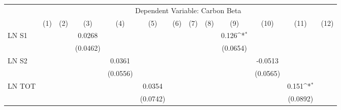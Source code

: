 {
\def\sym#1{\ifmmode^{#1}\else\(^{#1}\)\fi}
\begin{tabular}{l*{12}{c}}
\hline\hline
                    &\multicolumn{12}{c}{Dependent Variable: Carbon Beta}                                                                                                                                                                                                                   \\\cmidrule(lr){2-13}
                    &\multicolumn{1}{c}{(1)}         &\multicolumn{1}{c}{(2)}         &\multicolumn{1}{c}{(3)}         &\multicolumn{1}{c}{(4)}         &\multicolumn{1}{c}{(5)}         &\multicolumn{1}{c}{(6)}         &\multicolumn{1}{c}{(7)}         &\multicolumn{1}{c}{(8)}         &\multicolumn{1}{c}{(9)}         &\multicolumn{1}{c}{(10)}         &\multicolumn{1}{c}{(11)}         &\multicolumn{1}{c}{(12)}         \\
\hline
LN S1               &                     &                     &      0.0268         &                     &                     &                     &                     &                     &       0.126\sym{*}  &                     &                     &                     \\
                    &                     &                     &    (0.0462)         &                     &                     &                     &                     &                     &    (0.0654)         &                     &                     &                     \\
LN S2               &                     &                     &                     &      0.0361         &                     &                     &                     &                     &                     &     -0.0513         &                     &                     \\
                    &                     &                     &                     &    (0.0556)         &                     &                     &                     &                     &                     &    (0.0565)         &                     &                     \\
LN TOT              &                     &                     &                     &                     &      0.0354         &                     &                     &                     &                     &                     &       0.151\sym{*}  &                     \\
                    &                     &                     &                     &                     &    (0.0742)         &                     &                     &                     &                     &                     &    (0.0892)         &                     \\

\end{tabular}}
